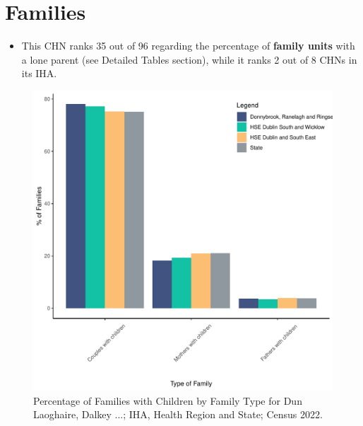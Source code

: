 \documentclass{article}
\begin{document}
\section{Families}\label{sect:Fam}
\begin{itemize}
\item This CHN ranks  35 out of 96 regarding the percentage of \textbf{family units} with a lone parent (see Detailed Tables section), while it ranks   2 out of 8 CHNs in its IHA.
\end{itemize}
\begin{figure}[H]
	\centering
	\includegraphics[width = 150mm]{../figures/FamED.pdf}
	\caption{Percentage of Families with Children by Family Type for Dun Laoghaire, Dalkey ...; IHA, Health Region and State; Census 2022.}
	\label{fig:vbnv}
	\end{figure}
	
\end{document}
